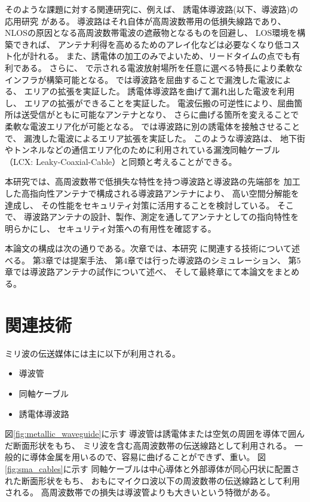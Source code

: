 \documentclass[technicalreport]{ieicej}
\begin{document}
そのような課題に対する関連研究に、例えば、
誘電体導波路(以下、導波路)の応用研究
\cite{bending_antenna} \cite{leaky_wave_antenna_bent_dielectric}
がある。
導波路はそれ自体が高周波数帯用の低損失線路であり、
NLOSの原因となる高周波数帯電波の遮蔽物となるものを回避し、
LOS環境を構築できれば、
アンテナ利得を高めるためのアレイ化などは必要なくなり低コスト化が計れる。
また、誘電体の加工のみでよいため、リードタイムの点でも有利である。
さらに、\cite{bending_antenna}
\cite{leaky_wave_antenna_bent_dielectric} \cite{pinching_antenna}
で示される電波放射場所を任意に選べる特長により柔軟なインフラが構築可能となる。
\cite{bending_antenna}では導波路を屈曲することで漏洩した電波による、
エリアの拡張を実証した。
誘電体導波路を曲げて漏れ出した電波を利用し、
エリアの拡張ができることを実証した。
電波伝搬の可逆性により、屈曲箇所は送受信がともに可能なアンテナとなり、
さらに曲げる箇所を変えることで柔軟な電波エリア化が可能となる。
\cite{leaky_wave_antenna_bent_dielectric} \cite{pinching_antenna}
では導波路に別の誘電体を接触させることで、
漏洩した電波によるエリア拡張を実証した。
このような導波路は、
地下街やトンネルなどの通信エリア化のために利用されている漏洩同軸ケーブル
（LCX: Leaky-Coaxial-Cable）と同類と考えることができる。

本研究では、高周波数帯で低損失な特性を持つ導波路と導波路の先端部を
加工した高指向性アンテナで構成される導波路アンテナにより、
高い空間分解能を達成し、
その性能をセキュリティ対策に活用することを検討している。
そこで、
導波路アンテナの設計、製作、測定を通してアンテナとしての指向特性を明らかにし、
セキュリティ対策への有用性を確認する。

本論文の構成は次の通りである。次章では、本研究
に関連する技術について述べる。
第3章では提案手法、
第4章では行った導波路のシミュレーション、
第5章では導波路アンテナの試作について述べ、
そして最終章にて本論文をまとめる。

\section{関連技術}

ミリ波の伝送媒体には主に以下が利用される。
\begin{itemize}
  \item 導波管
  \item 同軸ケーブル
  \item 誘電体導波路
\end{itemize}

図\ref{fig:metallic_waveguide}に示す
導波管は誘電体または空気の周囲を導体で囲んだ断面形状をもち、
ミリ波を含む高周波数帯の伝送線路として利用される。
一般的に導体金属を用いるので、容易に曲げることができず、重い。
図\ref{fig:sma_cables}に示す
同軸ケーブルは中心導体と外部導体が同心円状に配置された断面形状をもち、
おもにマイクロ波以下の周波数帯の伝送線路として利用される。
高周波数帯での損失は導波管よりも大きいという特徴がある。
\end{document}
